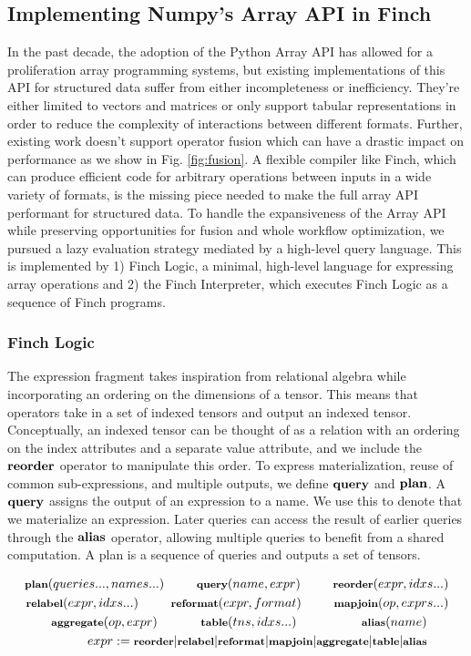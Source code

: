 \subsection{Implementing Numpy's Array API in Finch}
In the past decade, the adoption of the Python Array API \cite{harris_array_2020} has allowed for a proliferation array programming systems, but existing implementations of this API for structured data suffer from either incompleteness or inefficiency. They're either limited to vectors and matrices or only support tabular representations in order to reduce the complexity of interactions between different formats. Further, existing work doesn't support operator fusion which can have a drastic impact on performance as we show in Fig. \ref{fig:fusion}. A flexible compiler like Finch, which can produce efficient code for arbitrary operations between inputs in a wide variety of formats, is the missing piece needed to make the full array API performant for structured data. To handle the expansiveness of the Array API while preserving opportunities for fusion and whole workflow optimization, we pursued a lazy evaluation strategy mediated by a high-level query language. This is implemented by 1) Finch Logic, a minimal, high-level language for expressing array operations and 2) the Finch Interpreter, which executes Finch Logic as a sequence of Finch programs.

\subsubsection{Finch Logic}
The expression fragment takes inspiration from relational algebra while incorporating an ordering on the dimensions of a tensor. This means that operators take in a set of indexed tensors and output an indexed tensor. Conceptually, an indexed tensor can be thought of as a relation with an ordering on the index attributes and a separate value attribute, and we include the $\text{\textbf{reorder}}$ operator to manipulate this order. To express materialization, reuse of common sub-expressions, and multiple outputs, we define $\text{\textbf{query}}$ and $\text{\textbf{plan}}$. A $\text{\textbf{query}}$ assigns the output of an expression to a name. We use this to denote that we materialize an expression. Later queries can access the result of earlier queries through the $\text{\textbf{alias}}$ operator, allowing multiple queries to benefit from a shared computation. A plan is a sequence of queries and outputs a set of tensors. 

\begin{align*}
    \footnotesize \text{\textbf{plan}}(queries..., names...) \quad\quad\quad \text{\textbf{query}}(name, expr) \quad\quad\quad \text{\textbf{reorder}}(expr, idxs...)\\
     \footnotesize \text{\textbf{relabel}}(expr, idxs...) \quad\quad\quad \text{\textbf{reformat}}(expr, format) \quad\quad\quad \text{\textbf{mapjoin}}(op, exprs...) \\
    \footnotesize\text{\textbf{aggregate}}(op, expr)\quad\quad\quad\quad \text{\textbf{table}}(tns, idxs...)  \quad\quad\quad\quad\quad\quad \text{\textbf{alias}}(name) \quad\quad\\
     \footnotesize expr:= \text{\textbf{reorder}} | \text{\textbf{relabel}} | \text{\textbf{reformat}} |\text{\textbf{mapjoin}} | \text{\textbf{aggregate}} | \text{\textbf{table}} | \text{\textbf{alias}} \quad\quad
\end{align*}

